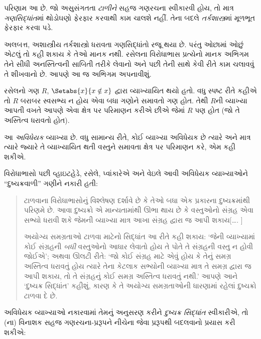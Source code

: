 પરિણામ આ છે. જો અસુસંગતતા \emph{ટાળીને} સહજ ગણરચના સ્વીકારવી
હોય, તો માત્ર \emph{ગણસિદ્ધાંત}માં થોડોઘણો ફેરફાર કરવાથી કામ
ચાલશે નહીં. તેના બદલે \emph{તર્કશાસ્ત્ર}માં મૂળભૂત ફેરફાર કરવા પડે.

અલબત્ત, અશાસ્ત્રીય તર્કશાસ્ત્રો ધરાવતા ગણસિદ્ધાંતો રજૂ થયા છે.
પરંતુ ઓછામાં ઓછું એટલું તો કહી શકાય કે તેઓ માનક નથી. રસેલના
વિરોધાભાસ પ્રત્યેનો માનક અભિગમ તેને સીધી અનસ્તિત્વની સાબિતી તરીકે
લેવાનો અને પછી તેની સાથે કેવી રીતે કામ ચલાવવું તે શીખવાનો છે.
આપણે આ જ અભિગમ અપનાવીશું.
\endgroup

\begingroup
\makeatletter{}\makeatother


\label{guunit:OLP-0533}


રસેલનો ગણ $R$, $\Setabs{x}{x \notin
x}$ દ્વારા વ્યાખ્યાયિત થયો હતો. વધુ સ્પષ્ટ રીતે કહીએ તો $R$
બરાબર સ્વસભ્ય ન હોય એવા બધા ગણોને સમાવતો ગણ હોત. તેથી $R$ની
વ્યાખ્યા આપતી વખતે આપણે એવા ક્ષેત્ર પર પરિમાણન કરીએ છીએ જેમાં
$R$ પણ હોત (જો તે અસ્તિત્વ ધરાવતો હોત).

આ \emph{અવિધેયક} વ્યાખ્યા છે. વધુ સામાન્ય રીતે, કોઈ વ્યાખ્યા
અવિધેયક છે ત્યારે અને માત્ર ત્યારે જ્યારે તે વ્યાખ્યાયિત થતી
વસ્તુને સમાવતા ક્ષેત્ર પર પરિમાણન કરે, એમ કહી શકીએ.

વિરોધાભાસો પછી વ્હાઇટહેડે, રસેલે, પ્વાંકારેએ અને વેઇલે આવી
અવિધેયક વ્યાખ્યાઓને ``દુષ્ચક્રવાળી'' ગણીને નકારી હતી:
\begin{quote}
ટાળવાના વિરોધાભાસોનું વિશ્લેષણ દર્શાવે છે કે તેઓ બધા એક પ્રકારના
દુષ્ચક્રમાંથી પરિણમે છે. આવા દુષ્ચક્રો એ માન્યતામાંથી ઊભા થાય છે
કે વસ્તુઓનો સંગ્રહ એવા સભ્યો ધરાવી શકે જેમની વ્યાખ્યા માત્ર આખા
સંગ્રહ દ્વારા જ આપી શકાય[\ldots. \textparagraph]

અયોગ્ય સમગ્રતાઓ ટાળવા માટેનો સિદ્ધાંત આ રીતે કહી શકાય:
`જેની વ્યાખ્યામાં કોઈ સંગ્રહની \emph{બધી} વસ્તુઓનો આધાર લેવાતો હોય તે પોતે તે
સંગ્રહની વસ્તુ ન હોવી જોઈએ'; અથવા ઊલટી રીતે:
`જો કોઈ સંગ્રહ માટે એવું હોય કે તેનું સમગ્ર અસ્તિત્વ ધરાવતું હોય ત્યારે તેના કેટલાક
સભ્યોની વ્યાખ્યા માત્ર તે સમગ્ર દ્વારા જ આપી શકાય, તો તે
સંગ્રહનું કોઈ સમગ્ર અસ્તિત્વ ધરાવતું નથી.' આપણે આને
`દુષ્ચક્ર સિદ્ધાંત' કહીશું, કારણ કે તે અયોગ્ય સમગ્રતાઓની
ધારણામાં રહેલાં દુષ્ચક્રો ટાળવા દે છે.
\citep[p.~37]{WhiteheadRussell1910}
\end{quote}
અવિધેયક વ્યાખ્યાઓ નકારવામાં તેમનું અનુસરણ કરીને
\emph{દુષ્ચક્ર સિદ્ધાંત} સ્વીકારીએ, તો
(ના) વિનાશક સહજ ગણરચના-પ્રરૂપને
નીચેના જેવા પ્રરૂપથી બદલવાનો પ્રયાસ કરી શકીએ:

